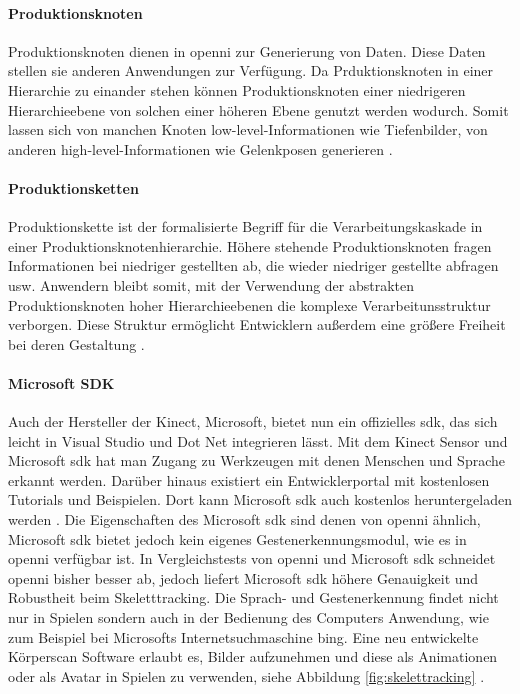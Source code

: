 \paragraph{Produktionsknoten}
Produktionsknoten dienen in \gls{openni} zur Generierung von Daten.
Diese Daten stellen sie anderen Anwendungen zur Verfügung.
Da Prduktionsknoten in einer Hierarchie zu einander stehen können Produktionsknoten einer niedrigeren Hierarchieebene von solchen einer höheren Ebene genutzt werden wodurch.
Somit lassen sich von manchen Knoten low-level-Informationen wie Tiefenbilder, von anderen high-level-Informationen wie Gelenkposen generieren \cite{kinect_6}.

\paragraph{Produktionsketten}
Produktionskette ist der formalisierte Begriff für die Verarbeitungskaskade in einer Produktionsknotenhierarchie.
Höhere stehende Produktionsknoten fragen Informationen bei niedriger gestellten ab, die wieder niedriger gestellte abfragen usw.
Anwendern bleibt somit, mit der Verwendung der abstrakten Produktionsknoten hoher Hierarchieebenen die komplexe Verarbeitunsstruktur verborgen.
Diese Struktur ermöglicht Entwicklern außerdem eine größere Freiheit bei deren Gestaltung \cite{kinect_6}.

\paragraph{Microsoft SDK}
Auch der Hersteller der Kinect, Microsoft, bietet nun ein offizielles \gls{sdk}, das sich leicht in Visual Studio und Dot Net integrieren lässt.
Mit dem Kinect Sensor und Microsoft \gls{sdk} hat man Zugang zu Werkzeugen mit denen Menschen und Sprache erkannt werden.
Darüber hinaus existiert ein Entwicklerportal mit kostenlosen Tutorials und Beispielen.
Dort kann Microsoft \gls{sdk} auch kostenlos heruntergeladen werden \cite{kinect_4}.
Die Eigenschaften des Microsoft \gls{sdk} sind denen von \gls{openni} ähnlich, Microsoft \gls{sdk} bietet jedoch kein eigenes Gestenerkennungsmodul, wie es in \gls{openni} verfügbar ist.
In Vergleichstests von \gls{openni} und Microsoft \gls{sdk} schneidet \gls{openni} bisher besser ab, jedoch liefert Microsoft \gls{sdk} höhere Genauigkeit und Robustheit beim Skeletttracking.
Die Sprach- und Gestenerkennung findet nicht nur in Spielen sondern auch in der Bedienung des Computers Anwendung, wie zum Beispiel bei Microsofts Internetsuchmaschine bing.
Eine neu entwickelte Körperscan Software erlaubt es, Bilder aufzunehmen und diese als Animationen oder als Avatar in Spielen zu verwenden, siehe Abbildung \ref{fig:skelettracking} \cite{kinect_5}.


